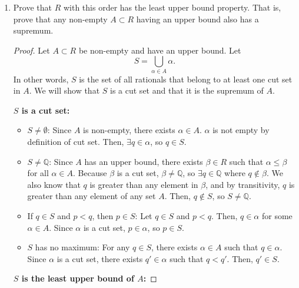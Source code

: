 \documentclass[10pt]{article}
\newcommand{\Q}{\mathbb{Q}}
\newenvironment{problem}[2][Problem]{\begin{trivlist}
\item[\hskip \labelsep {\bfseries #1}\hskip \labelsep {\bfseries #2.}]}{\end{trivlist}}
\begin{document}
\begin{problem}{2}
\begin{enumerate}
\begin{proof}
                \textbf{Transitivity:} Let $\alpha, \beta, \gamma \in R$ such that $\alpha < \beta$ and $\beta < \gamma$. Then, $\alpha \subsetneq \beta$ and $\beta \subsetneq \gamma$. This implies that $\alpha \subsetneq \gamma$, so $\alpha < \gamma$.
            \end{proof}
		\item Prove that $ R $ with this order has the least upper bound property. That is, prove that any non-empty $ A \subset R $ having an upper bound also has a supremum.
             \begin{proof}
                 Let $A \subset R$ be non-empty and have an upper bound. Let \[S = \bigcup_{\alpha \in A} \alpha.\]
                 In other words, $S$ is the set of all rationals that belong to at least one cut set in $A$. We will show that $S$ is a cut set and that it is the supremum of $A$.

                 \textbf{$S$ is a cut set:}
                 \begin{itemize}
                     \item $S \neq \emptyset$: Since $A$ is non-empty, there exists $\alpha \in A$. $\alpha$ is not empty by definition of cut set. Then, $\exists q \in \alpha$, so $q \in S$.
                        \item $S \neq \Q$: Since $A$ has an upper bound, there exists $\beta \in R$ such that $\alpha \leq \beta$ for all $\alpha \in A$. Because $\beta$ is a cut set, $\beta \neq \Q$, so $\exists q \in \Q$ where $q \not\in \beta$. We also know that $q$ is greater than any element in $\beta$, and by transitivity, $q$ is greater than any element of any set $A$.
                            Then, $q \not\in S$, so $S \neq \Q$.
                        \item If $q \in S$ and $p < q$, then $p \in S$: Let $q \in S$ and $p < q$. Then, $q \in \alpha$ for some $\alpha \in A$. Since $\alpha$ is a cut set, $p \in \alpha$, so $p \in S$.
                        \item $S$ has no maximum: For any $q \in S$, there exists $\alpha \in A$ such that $q \in \alpha$. Since $\alpha$ is a cut set, there exists $q' \in \alpha$ such that $q < q'$. Then, $q' \in S$.
                 \end{itemize}

                 \textbf{$S$ is the least upper bound of $A$:}


\end{proof}
\end{enumerate}
\end{problem}
\end{document}

